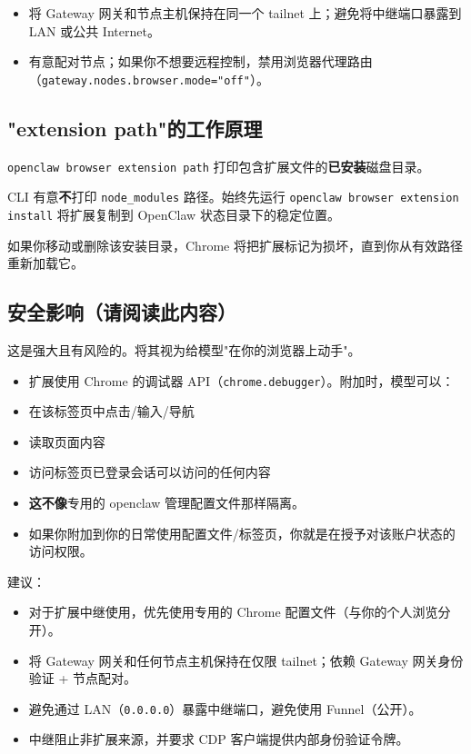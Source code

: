 \begin{itemize}
  \item 将 Gateway 网关和节点主机保持在同一个 tailnet 上；避免将中继端口暴露到 LAN 或公共 Internet。
  \item 有意配对节点；如果你不想要远程控制，禁用浏览器代理路由（\texttt{gateway.nodes.browser.mode="off"}）。
\end{itemize}


\subsection{"extension path"的工作原理}


\texttt{openclaw browser extension path} 打印包含扩展文件的\textbf{已安装}磁盘目录。

CLI 有意\textbf{不}打印 \texttt{node\_modules} 路径。始终先运行 \texttt{openclaw browser extension install} 将扩展复制到 OpenClaw 状态目录下的稳定位置。

如果你移动或删除该安装目录，Chrome 将把扩展标记为损坏，直到你从有效路径重新加载它。

\subsection{安全影响（请阅读此内容）}


这是强大且有风险的。将其视为给模型"在你的浏览器上动手"。

\begin{itemize}
  \item 扩展使用 Chrome 的调试器 API（\texttt{chrome.debugger}）。附加时，模型可以：
  \item 在该标签页中点击/输入/导航
  \item 读取页面内容
  \item 访问标签页已登录会话可以访问的任何内容
  \item \textbf{这不像}专用的 openclaw 管理配置文件那样隔离。
  \item 如果你附加到你的日常使用配置文件/标签页，你就是在授予对该账户状态的访问权限。
\end{itemize}


建议：

\begin{itemize}
  \item 对于扩展中继使用，优先使用专用的 Chrome 配置文件（与你的个人浏览分开）。
  \item 将 Gateway 网关和任何节点主机保持在仅限 tailnet；依赖 Gateway 网关身份验证 + 节点配对。
  \item 避免通过 LAN（\texttt{0.0.0.0}）暴露中继端口，避免使用 Funnel（公开）。
  \item 中继阻止非扩展来源，并要求 CDP 客户端提供内部身份验证令牌。
\end{itemize}



